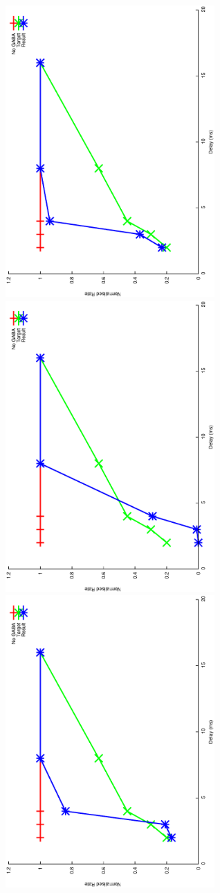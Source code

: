 \documentclass{article}
\begin{document}
\includegraphics[keepaspectratio=true,angle=-90,width=0.6\textwidth]{DS_ClickRecovery_result.18.eps}\clearpage
\includegraphics[keepaspectratio=true,angle=-90,width=0.6\textwidth]{DS_ClickRecovery_result.19.eps}\clearpage
\includegraphics[keepaspectratio=true,angle=-90,width=0.6\textwidth]{DS_ClickRecovery_result.20.eps}\clearpage





% 
\end{document}
